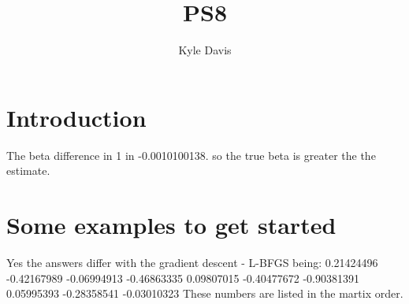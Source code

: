\documentclass{article}
\title{PS8}
\author{Kyle Davis}
\begin{document}
\maketitle

\section{Introduction}

The beta difference in 1 in -0.0010100138. so the true beta is greater the the estimate.

\section{Some examples to get started}

Yes the answers differ with the gradient descent - L-BFGS being:
0.21424496 -0.42167989 -0.06994913 -0.46863335  0.09807015 -0.40477672
-0.90381391  0.05995393 -0.28358541 -0.03010323
These numbers are listed in the martix order.


\section{}
\end{document}
